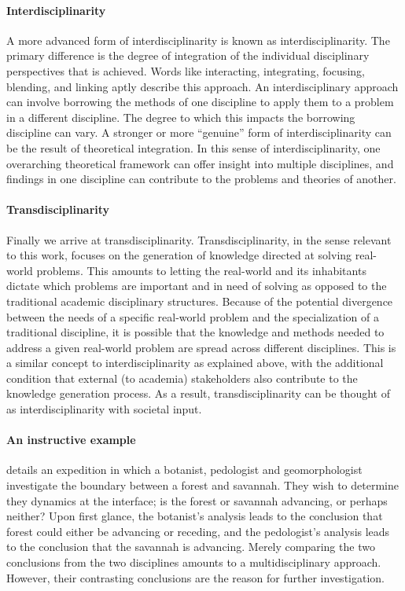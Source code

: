 \documentclass[a4paper]{article}
\begin{document}
\paragraph{Interdisciplinarity}

A more advanced form of interdisciplinarity is known as interdisciplinarity.
The primary difference is the degree of integration of the individual
disciplinary perspectives that is achieved. Words like interacting,
integrating, focusing, blending, and linking aptly describe this approach. An
interdisciplinary approach can involve borrowing the methods of one discipline
to apply them to a problem in a different discipline. The degree to which this
impacts the borrowing discipline can vary. A stronger or more ``genuine'' form
of interdisciplinarity can be the result of theoretical integration. In this
sense of interdisciplinarity, one overarching theoretical framework can offer
insight into multiple disciplines, and findings in one discipline can
contribute to the problems and theories of another.

\paragraph{Transdisciplinarity}

Finally we arrive at transdisciplinarity. Transdisciplinarity, in the sense
relevant to this work, focuses on the generation of knowledge directed at
solving real-world problems. This amounts to letting the real-world and its
inhabitants dictate which problems are important and in need of solving as
opposed to the traditional academic disciplinary structures. Because of the
potential divergence between the needs of a specific real-world problem and
the specialization of a traditional discipline, it is possible that the
knowledge and methods needed to address a given real-world problem are spread
across different disciplines. This is a similar concept to interdisciplinarity
as explained above, with the additional condition that external (to academia)
stakeholders also contribute to the knowledge generation process. As a result,
transdisciplinarity can be thought of as interdisciplinarity with societal
input. 

\paragraph{An instructive example}

\cite{latour1999circulating} details an expedition in which a botanist,
pedologist and geomorphologist investigate the boundary between a forest and
savannah. They wish to determine they dynamics at the interface; is the forest
or savannah advancing, or perhaps neither? Upon first glance, the botanist's
analysis leads to the conclusion that forest could either be advancing or
receding, and the pedologist's analysis leads to the conclusion that the
savannah is advancing.  Merely comparing the two conclusions from the two
disciplines amounts to a multidisciplinary approach. However, their
contrasting conclusions are the reason for further investigation.
\end{document}

